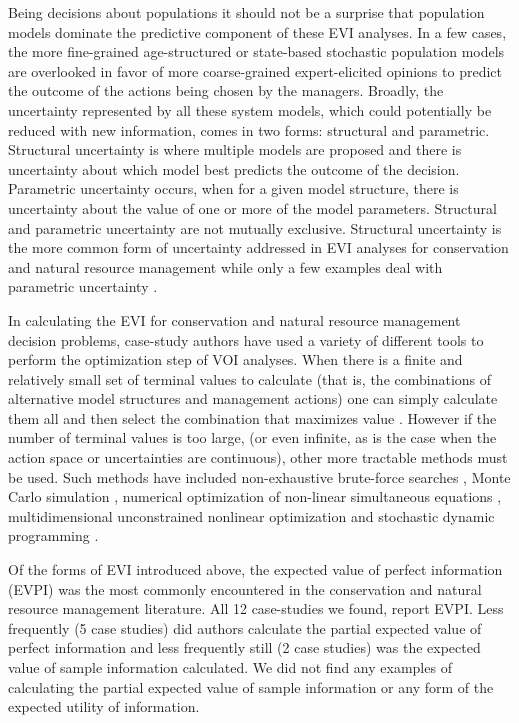 \documentclass[]{article}
\theoremstyle{definition}
\theoremstyle{definition}
\theoremstyle{definition}
\theoremstyle{remark}
\begin{document}
Being decisions about populations it should not be a surprise that
population models dominate the predictive component of these EVI
analyses. In a few cases, the more fine-grained age-structured or
state-based stochastic population models
\citep[e.g.,][]{Kuikka1999, Costello2010, Moore2012} are overlooked in
favor of more coarse-grained expert-elicited opinions
\citep[e.g.,][]{Runge2011a, Robinson2016} to predict the outcome of the
actions being chosen by the managers. Broadly, the uncertainty
represented by all these system models, which could potentially be
reduced with new information, comes in two forms: structural and
parametric. Structural uncertainty is where multiple models are proposed
and there is uncertainty about which model best predicts the outcome of
the decision. Parametric uncertainty occurs, when for a given model
structure, there is uncertainty about the value of one or more of the
model parameters. Structural and parametric uncertainty are not mutually
exclusive. Structural uncertainty is the more common form of uncertainty
addressed in EVI analyses for conservation and natural resource
management while only a few examples deal with parametric uncertainty
\citep{Moore2012, Maxwell2015, Robinson2016}.

In calculating the EVI for conservation and natural resource management
decision problems, case-study authors have used a variety of different
tools to perform the optimization step of VOI analyses. When there is a
finite and relatively small set of terminal values to calculate (that
is, the combinations of alternative model structures and management
actions) one can simply calculate them all and then select the
combination that maximizes value
\citep[e.g.,][]{Runge2011a, Johnson2014b, Canessa2015, Robinson2016}.
However if the number of terminal values is too large, (or even
infinite, as is the case when the action space or uncertainties are
continuous), other more tractable methods must be used. Such methods
have included non-exhaustive brute-force searches
\citep{Mantyniemi2009}, Monte Carlo simulation
\citep{Kuikka1999, Moore2012}, numerical optimization of non-linear
simultaneous equations \citep{Moore2011}, multidimensional unconstrained
nonlinear optimization \citep{Maxwell2015} and stochastic dynamic
programming \citep{Johnson2014a, Williams2015}.

Of the forms of EVI introduced above, the expected value of perfect
information (EVPI) was the most commonly encountered in the conservation
and natural resource management literature. All 12 case-studies we
found, report EVPI. Less frequently (5 case studies) did authors
calculate the partial expected value of perfect information and less
frequently still (2 case studies) was the expected value of sample
information calculated. We did not find any examples of calculating the
partial expected value of sample information or any form of the expected
utility of information.
\end{document}

